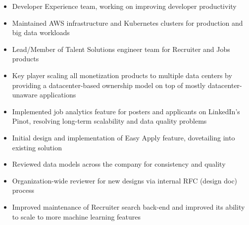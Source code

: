 \documentclass[letterpaper,11pt,twoside]{article}
\begin{document}
\vspace{-14pt}
\begin{itemize}
\item Developer Experience team, working on improving developer productivity
\item Maintained AWS infrastructure and Kubernetes clusters for production and
  big data workloads
\end{itemize}

\vspace{-14pt}
\begin{itemize}
\item Lead/Member of Talent Solutions engineer team for Recruiter and Jobs products
\item Key player scaling all monetization products to multiple data centers by providing
  a datacenter-based ownership model on top of mostly datacenter-unaware applications
\item Implemented job analytics feature for posters and applicants on LinkedIn's Pinot,
  resolving long-term scalability and data quality problems
\item Initial design and implementation of Easy Apply feature, dovetailing into existing solution
\item Reviewed data models across the company for consistency and quality
\item Organization-wide reviewer for new designs via internal RFC (design doc) process
\item Improved maintenance of Recruiter search back-end and improved its
  ability to scale to more machine learning features
\end{itemize}
\end{document}
